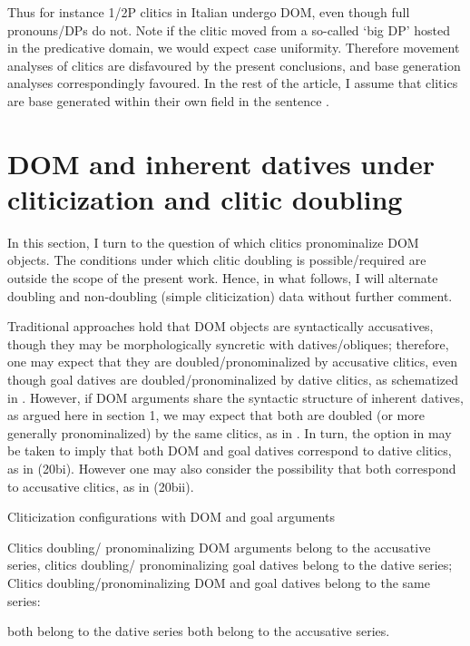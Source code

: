 \documentclass[output=paper]{langscibook}
\begin{document}
Thus for instance 1/2P clitics in Italian undergo DOM, even though full pronouns/DPs do not. Note if the clitic moved from a so-called ‘big DP’ hosted in the predicative domain, we would expect case uniformity. Therefore movement analyses of clitics are disfavoured by the present conclusions, and base generation analyses correspondingly favoured. In the rest of the article, I assume that clitics are base generated within their own field in the sentence \citep{Sportiche1996}.

\section{ DOM and inherent datives under cliticization and clitic doubling}  %

In this section, I turn to the question of which clitics pronominalize DOM objects. The conditions under which clitic doubling is possible/required are outside the scope of the present work. Hence, in what follows, I will alternate doubling and non-doubling (simple cliticization) data without further comment. 

Traditional approaches hold that DOM objects are syntactically accusatives, though they may be morphologically syncretic with datives/obliques; therefore, one may expect that they are doubled/pronominalized by accusative clitics, even though goal datives are doubled/pronominalized by dative clitics, as schematized in . However, if DOM arguments share the syntactic structure of inherent datives, as argued here in section 1, we may expect that both are doubled (or more generally pronominalized) by the same clitics, as in . In turn, the option in  may be taken to imply that both DOM and goal datives correspond to dative clitics, as in (20bi). However one may also consider the possibility that both correspond to accusative clitics, as in (20bii). 

\ea\label{ex:manzini:}
{Cliticization configurations with DOM and goal arguments}\\
\begin{xlist}
\ex Clitics doubling/ pronominalizing DOM arguments belong to the accusative series, clitics doubling/ pronominalizing goal datives belong to the dative series;
\ex Clitics doubling/pronominalizing DOM and goal datives belong to the same series:
\begin{xlist}
\ex both belong to the dative series
\ex both belong to the accusative series.
\end{xlist}
\end{xlist}
\z
\end{document}
